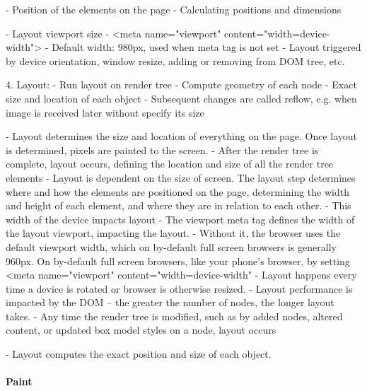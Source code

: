 
- Position of the elements on the page
- Calculating positions and dimensions




- Layout viewport size
- <meta name="viewport" content="width=device-width">
- Default width: 980px, used when meta tag is not set
- Layout triggered by device orientation, window resize, adding or removing from DOM tree, etc.
	

4. Layout:
- Run layout on render tree
- Compute geometry of each node
- Exact size and location of each object
- Subsequent changes are called reflow, e.g. when image is received later without specify its size




- Layout determines the size and location of everything on the page. Once layout is determined, pixels are painted to the screen.
-  After the render tree is complete, layout occurs, defining the location and size of all the render tree elements
- Layout is dependent on the size of screen. The layout step determines where and how the elements are positioned on the page, determining the width and height of each element, and where they are in relation to each other.
- This width of the device impacts layout
- The viewport meta tag defines the width of the layout viewport, impacting the layout.
- Without it, the browser uses the default viewport width, which on by-default full screen browsers is generally 960px. On by-default full screen browsers, like your phone's browser, by setting <meta name="viewport" content="width=device-width"
- Layout happens every time a device is rotated or browser is otherwise resized.
- Layout performance is impacted by the DOM -- the greater the number of nodes, the longer layout takes.
- Any time the render tree is modified, such as by added nodes, altered content, or updated box model styles on a node, layout occurs


- Layout computes the exact position and size of each object.






\paragraph{Paint}

